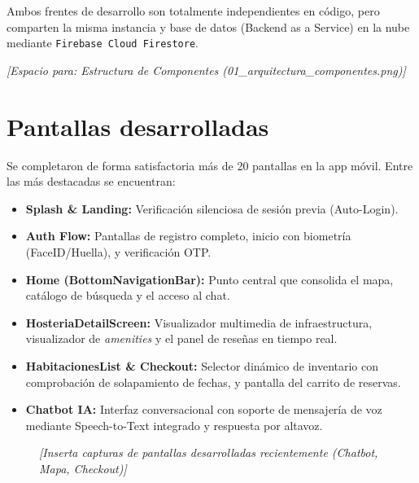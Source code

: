 \documentclass{article}
\begin{document}
Ambos frentes de desarrollo son totalmente independientes en código, pero comparten la misma instancia y base de datos (Backend as a Service) en la nube mediante \texttt{Firebase Cloud Firestore}.

\vspace{0.5cm}
\begin{center}
    \textit{[Espacio para: Estructura de Componentes (01\_arquitectura\_componentes.png)]}
\end{center}

\section{Pantallas desarrolladas}
Se completaron de forma satisfactoria más de 20 pantallas en la app móvil. Entre las más destacadas se encuentran:
\begin{itemize}[label=\small\color{verdeO}$\blacksquare$]
    \item \textbf{Splash \& Landing:} Verificación silenciosa de sesión previa (Auto-Login).
    \item \textbf{Auth Flow:} Pantallas de registro completo, inicio con biometría (FaceID/Huella), y verificación OTP.
    \item \textbf{Home (BottomNavigationBar):} Punto central que consolida el mapa, catálogo de búsqueda y el acceso al chat.
    \item \textbf{HosteriaDetailScreen:} Visualizador multimedia de infraestructura, visualizador de \textit{amenities} y el panel de reseñas en tiempo real.
    \item \textbf{HabitacionesList \& Checkout:} Selector dinámico de inventario con comprobación de solapamiento de fechas, y pantalla del carrito de reservas.
    \item \textbf{Chatbot IA:} Interfaz conversacional con soporte de mensajería de voz mediante Speech-to-Text integrado y respuesta por altavoz.
\end{itemize}

\begin{figure}[H]
    \centering
    \textit{[Inserta capturas de pantallas desarrolladas recientemente (Chatbot, Mapa, Checkout)]}
\end{figure}
\end{document}
